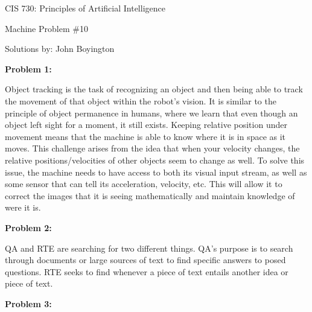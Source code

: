 \documentclass{amsart}
\theoremstyle{definition}
\begin{document}
\LARGE{CIS 730: Principles of Artificial Intelligence}
 
\large
Machine Problem \#10
 
Solutions by: John Boyington
\newline
\bigskip



\textbf{Problem 1:}
\bigbreak

Object tracking is the task of recognizing an object and then being able to track the movement of that object within the robot's vision.
It is similar to the principle of object permanence in humans, where we learn that even though an object left sight for a moment, it still exists.
Keeping relative position under movement means that the machine is able to know where it is in space as it moves.
This challenge arises from the idea that when your velocity changes, the relative positions/velocities of other objects seem to change as well.
To solve this issue, the machine needs to have access to both its visual input stream, as well as some sensor that can tell its acceleration, velocity, etc.
This will allow it to correct the images that it is seeing mathematically and maintain knowledge of were it is.


\bigbreak
\textbf{Problem 2:}
\bigbreak

QA and RTE are searching for two different things.
QA's purpose is to search through documents or large sources of text to find specific answers to posed questions.
RTE seeks to find whenever a piece of text entails another idea or piece of text.



\bigbreak
\textbf{Problem 3:}
\bigbreak
\end{document}
